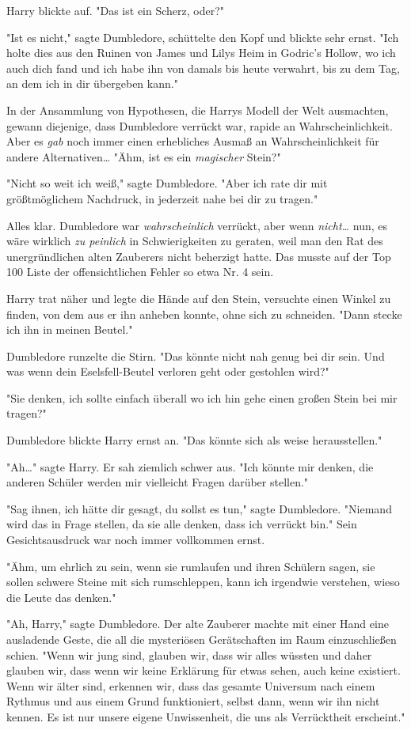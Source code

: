 {Harry blickte auf. "Das ist ein Scherz, oder?"

"Ist es nicht," sagte Dumbledore, schüttelte den Kopf und blickte sehr ernst. "Ich holte dies aus den Ruinen von James und Lilys Heim in Godric's Hollow, wo ich auch dich fand und ich habe ihn von damals bis heute verwahrt, bis zu dem Tag, an dem ich in dir übergeben kann."

In der Ansammlung von Hypothesen, die Harrys Modell der Welt ausmachten, gewann diejenige, dass Dumbledore verrückt war, rapide an Wahrscheinlichkeit. Aber es \emph{gab} noch immer einen erhebliches Ausmaß an Wahrscheinlichkeit für andere Alternativen… "Ähm, ist es ein \emph{magischer} Stein?"

"Nicht so weit ich weiß," sagte Dumbledore. "Aber ich rate dir mit größtmöglichem Nachdruck, in jederzeit nahe bei dir zu tragen."

Alles klar. Dumbledore war \emph{wahrscheinlich} verrückt, aber wenn \emph{nicht…} nun, es wäre wirklich \emph{zu peinlich} in Schwierigkeiten zu geraten, weil man den Rat des unergründlichen alten Zauberers nicht beherzigt hatte. Das musste auf der Top 100 Liste der offensichtlichen Fehler so etwa Nr. 4 sein.

Harry trat näher und legte die Hände auf den Stein, versuchte einen Winkel zu finden, von dem aus er ihn anheben konnte, ohne sich zu schneiden. "Dann stecke ich ihn in meinen Beutel."

Dumbledore runzelte die Stirn. "Das könnte nicht nah genug bei dir sein. Und was wenn dein Eselsfell-Beutel verloren geht oder gestohlen wird?"

"Sie denken, ich sollte einfach überall wo ich hin gehe einen großen Stein bei mir tragen?"

Dumbledore blickte Harry ernst an. "Das könnte sich als weise herausstellen."

"Ah…" sagte Harry. Er sah ziemlich schwer aus. "Ich könnte mir denken, die anderen Schüler werden mir vielleicht Fragen darüber stellen."

"Sag ihnen, ich hätte dir gesagt, du sollst es tun," sagte Dumbledore. "Niemand wird das in Frage stellen, da sie alle denken, dass ich verrückt bin." Sein Gesichtsausdruck war noch immer vollkommen ernst.

"Ähm, um ehrlich zu sein, wenn sie rumlaufen und ihren Schülern sagen, sie sollen schwere Steine mit sich rumschleppen, kann ich irgendwie verstehen, wieso die Leute das denken."

"Ah, Harry," sagte Dumbledore. Der alte Zauberer machte mit einer Hand eine ausladende Geste, die all die mysteriösen Gerätschaften im Raum einzuschließen schien. "Wenn wir jung sind, glauben wir, dass wir alles wüssten und daher glauben wir, dass wenn wir keine Erklärung für etwas sehen, auch keine existiert. Wenn wir älter sind, erkennen wir, dass das gesamte Universum nach einem Rythmus und aus einem Grund funktioniert, selbst dann, wenn wir ihn nicht kennen. Es ist nur unsere eigene Unwissenheit, die uns als Verrücktheit erscheint."

}
